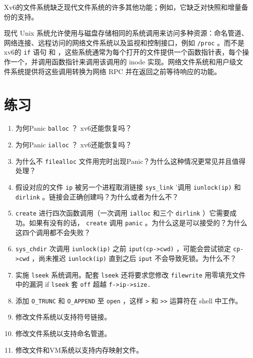 Xv6的文件系统缺乏现代文件系统的许多其他功能；例如，它缺乏对快照和增量备份的支持。  

现代 Unix 系统允许使用与磁盘存储相同的系统调用来访问多种资源：命名管道、网络连接、远程访问的网络文件系统以及监视和控制接口，例如
    \lstinline{/proc}    。而不是xv6的
    \lstinline{if}    语句
        和
       ，这些系统通常为每个打开的文件提供一个函数指针表，每个操作一个，并调用函数指针来调用该调用的 inode 实现。网络文件系统和用户级文件系统提供将这些调用转换为网络 RPC 并在返回之前等待响应的功能。
    \section{练习  }     

   \begin{enumerate}


   \item   为何Panic
    \lstinline{balloc}   ？ xv6还能恢复吗？   \item   为何Panic
    \lstinline{ialloc}   ？ xv6还能恢复吗？   \item   为什么不
    \lstinline{filealloc}    文件用完时出现Panic？为什么这种情况更常见并且值得处理？   \item   假设对应的文件
    \lstinline{ip}    被另一个进程取消链接
    \lstinline{sys_link}    '调用
    \lstinline{iunlock(ip)}    和
    \lstinline{dirlink}    。链接会正确创建吗？为什么或者为什么不？   \item      \lstinline{create}    进行四次函数调用（一次调用
    \lstinline{ialloc}    和三个
    \lstinline{dirlink}    ）它需要成功。如果有没有的话，
    \lstinline{create}    调用
    \lstinline{panic}    。为什么这是可以接受的？为什么这四个调用都不会失败？   \item      \lstinline{sys_chdir}    次调用
    \lstinline{iunlock(ip)}    之前
    \lstinline{iput(cp->cwd)}    ，可能会尝试锁定
    \lstinline{cp->cwd}   ，尚未推迟
    \lstinline{iunlock(ip)}    直到之后
    \lstinline{iput}    不会导致死锁。为什么不？   \item   实施
    \lstinline{lseek}    系统调用。配套
    \lstinline{lseek}    还将要求您修改
    \lstinline{filewrite}    用零填充文件中的漏洞 if
    \lstinline{lseek}   套
    \lstinline{off}    超越
    \lstinline{f->ip->size.}      \item   添加
    \lstinline{O_TRUNC}    和
    \lstinline{O_APPEND}    至
    \lstinline{open}    ，这样
    \lstinline{>}    和
    \lstinline{>>}    运算符在 shell 中工作。   \item   修改文件系统以支持符号链接。   \item   修改文件系统以支持命名管道。   \item   修改文件和VM系统以支持内存映射文件。  \end{enumerate}     


